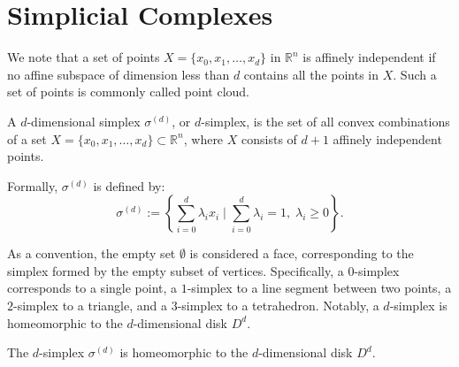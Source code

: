 \section{Simplicial Complexes}
\label{Simplicial Complexes} We note that a set of points
$X = \{x_{0}, x_{1}, \ldots, x_{d}\}$ in $\mathbb{R}^{n}$ is affinely
independent if no affine subspace
of dimension less than $d$ contains all the points in $X$. Such a set of points is
commonly called point cloud.

\begin{definition}[$d$-Simplex]{\cite[\S 2.1]{boissonnat2018geometric}}
\label{d-simplex} A $d$-dimensional
	simplex $\sigma^{(d)}$, or $d$-simplex, is the set of all convex combinations
	of a set $X = \{x_{0}, x_{1}, \ldots, x_{d}\} \subset \mathbb{R}^{n}$, where
	$X$ consists of $d+1$ affinely independent points.
	
	Formally, $\sigma^{(d)}$ is
	defined by:
	\begin{equation}
		\sigma^{(d)}:= \left\{\sum_{i=0}^{d}\lambda_{i} x_{i} \; | \; \sum_{i=0}^{d}\lambda
		_{i} = 1, \; \lambda_{i} \geq 0\right\}.
	\end{equation}
\end{definition}

As a convention, the empty set $\emptyset$ is considered a face, corresponding
to the simplex formed by the empty subset of vertices. Specifically, a $0$-simplex
corresponds to a single point, a $1$-simplex to a line segment between two
points, a $2$-simplex to a triangle, and a $3$-simplex to a tetrahedron. Notably,
a $d$-simplex is homeomorphic to the $d$-dimensional disk $D^{d}$.

\begin{theorem}
	The $d$-simplex $\sigma^{(d)}$ is homeomorphic to the $d$-dimensional disk $D^{d}$.
\end{theorem}

